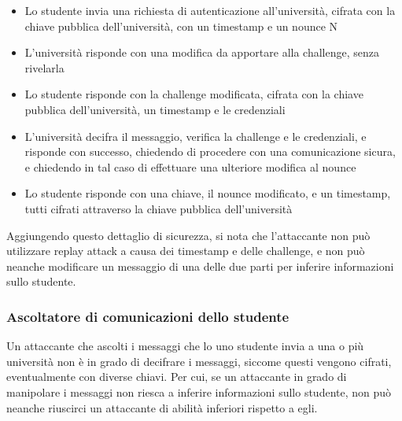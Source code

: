 \documentclass[a4paper,12pt]{article}
\begin{document}
\begin{itemize}
    \item Lo studente invia una richiesta di autenticazione all'università, cifrata con la chiave pubblica dell'università, con un timestamp e un nounce N
    \item L'università risponde con una modifica da apportare alla challenge, senza rivelarla
    \item Lo studente risponde con la challenge modificata, cifrata con la chiave pubblica dell'università, un timestamp e le credenziali
    \item L'università decifra il messaggio, verifica la challenge e le credenziali, e risponde con successo, chiedendo di procedere con una comunicazione sicura, e chiedendo in tal caso di effettuare una ulteriore modifica al nounce
    \item Lo studente risponde con una chiave, il nounce modificato, e un timestamp, tutti cifrati attraverso la chiave pubblica dell'università
\end{itemize}
Aggiungendo questo dettaglio di sicurezza, si nota che l'attaccante non può utilizzare replay attack a causa dei timestamp e delle challenge, e non può neanche modificare un messaggio di una delle due parti per inferire informazioni sullo studente.
\subsubsection{Ascoltatore di comunicazioni dello studente}
Un attaccante che ascolti i messaggi che lo uno studente invia a una o più università non è in grado di decifrare i messaggi, siccome questi vengono cifrati, eventualmente con diverse chiavi. Per cui, se un attaccante in grado di manipolare i messaggi non riesca a inferire informazioni sullo studente, non può neanche riuscirci un attaccante di abilità inferiori rispetto a egli.
\end{document}
